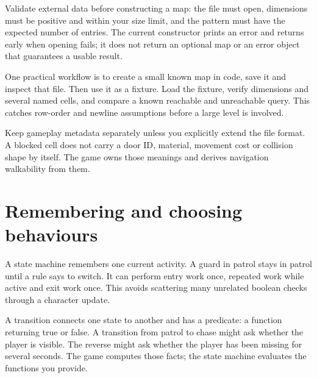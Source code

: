 \documentclass[11pt,a4paper]{article}
\begin{document}
Validate external data before constructing a map: the file must open, dimensions must be positive and within your size limit, and the pattern must have the expected number of entries. The current constructor prints an error and returns early when opening fails; it does not return an optional map or an error object that guarantees a usable result.

One practical workflow is to create a small known map in code, save it and inspect that file. Then use it as a fixture. Load the fixture, verify dimensions and several named cells, and compare a known reachable and unreachable query. This catches row-order and newline assumptions before a large level is involved.

Keep gameplay metadata separately unless you explicitly extend the file format. A blocked cell does not carry a door ID, material, movement cost or collision shape by itself. The game owns those meanings and derives navigation walkability from them.
\clearpage\part{Remembering and choosing behaviours}
A state machine remembers one current activity. A guard in patrol stays in patrol until a rule says to switch. It can perform entry work once, repeated work while active and exit work once. This avoids scattering many unrelated boolean checks through a character update.

A transition connects one state to another and has a predicate: a function returning true or false. A transition from patrol to chase might ask whether the player is visible. The reverse might ask whether the player has been missing for several seconds. The game computes those facts; the state machine evaluates the functions you provide.

\begin{center}\end{center}
\end{document}
